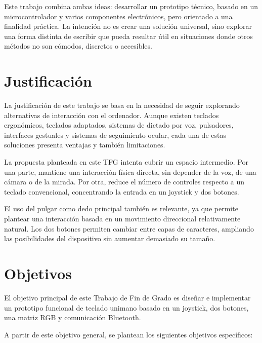 \documentclass[
    school=etsisi,
    type=pfg,
    degree=61CI,
]{upm-report}
\begin{document}
Este trabajo combina ambas ideas: desarrollar un prototipo técnico, basado en un
microcontrolador y varios componentes electrónicos, pero orientado a una finalidad
práctica. La intención no es crear una solución universal, sino explorar una forma
distinta de escribir que pueda resultar útil en situaciones donde otros métodos no
son cómodos, discretos o accesibles.

\section{Justificación}
\label{sec:justificacion}

La justificación de este trabajo se basa en la necesidad de seguir explorando
alternativas de interacción con el ordenador. Aunque existen teclados ergonómicos,
teclados adaptados, sistemas de dictado por voz, pulsadores, interfaces gestuales
y sistemas de seguimiento ocular, cada una de estas soluciones presenta ventajas y
también limitaciones.

La propuesta planteada en este TFG intenta cubrir un espacio intermedio. Por una
parte, mantiene una interacción física directa, sin depender de la voz, de una
cámara o de la mirada. Por otra, reduce el número de controles respecto a un
teclado convencional, concentrando la entrada en un joystick y dos botones.

El uso del pulgar como dedo principal también es relevante, ya que permite plantear
una interacción basada en un movimiento direccional relativamente natural. Los dos
botones permiten cambiar entre capas de caracteres, ampliando las posibilidades
del dispositivo sin aumentar demasiado su tamaño.

\section{Objetivos}
\label{sec:objetivos}

El objetivo principal de este Trabajo de Fin de Grado es diseñar e implementar un
prototipo funcional de teclado unimano basado en un joystick, dos botones, una
matriz RGB y comunicación Bluetooth.

A partir de este objetivo general, se plantean los siguientes objetivos
específicos:
\end{document}
